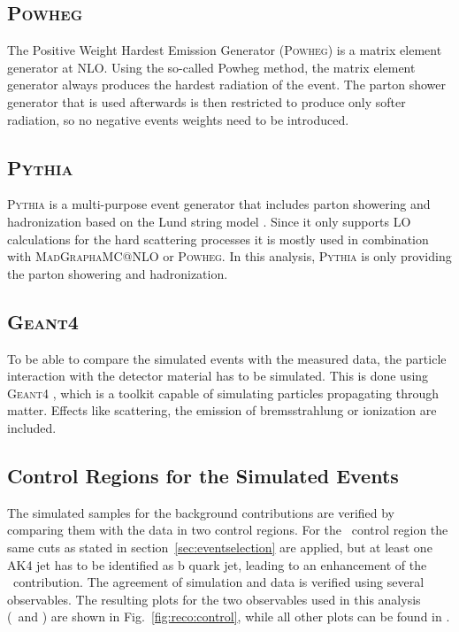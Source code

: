 \subsection*{\textsc{Powheg}}
The Positive Weight Hardest Emission Generator (\textsc{Powheg}) \cite{powheg1,powheg2,powheg3} is a matrix element generator at NLO. Using the so-called Powheg method, the matrix element generator always produces the hardest radiation of the event. The parton shower generator that is used afterwards is then restricted to produce only softer radiation, so no negative events weights need to be introduced.
\subsection*{\textsc{Pythia}}
\textsc{Pythia} \cite{pythia1,pythia2} is a multi-purpose event generator that includes parton showering and hadronization based on the Lund string model \cite{lund}. Since it only supports LO calculations for the hard scattering processes it is mostly used in combination with \textsc{MadGraph\textunderscore aMC@NLO} or \textsc{Powheg}. In this analysis, \textsc{Pythia} is only providing the parton showering and hadronization.
\subsection*{\textsc{Geant4}}
To be able to compare the simulated events with the measured data, the particle interaction with the detector material has to be simulated. This is done using \textsc{Geant4} \cite{geant4}, which is a toolkit capable of simulating particles propagating through matter. Effects like scattering, the emission of bremsstrahlung or ionization are included.
\subsection*{Control Regions for the Simulated Events}
The simulated samples for the background contributions are verified by comparing them with the data in two control regions. For the \ttbar \ control region the same cuts as stated in section~\ref{sec:eventselection} are applied, but at least one AK4 jet has to be identified as b quark jet, leading to an enhancement of the \ttbar \ contribution. The agreement of simulation and data is verified using several observables. The resulting plots for the two observables used in this analysis (\Mpr \ and \MWV) are shown in Fig.~\ref{fig:reco:control}, while all other plots can be found in \cite{PAS}.\\

